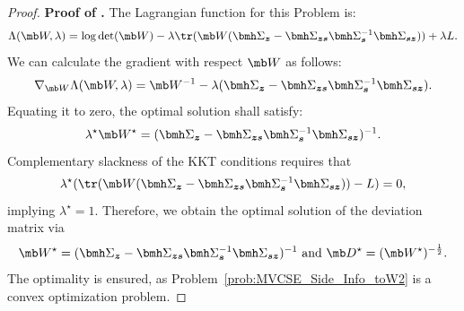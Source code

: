 \documentclass[mnsc, nonblindrev]{informswp}
\newcommand{\1}[1]{\mathds{1}{\left(#1\right)}}
\begin{document}
\begin{appendices}
\begin{proof}{\bf Proof of .}
The Lagrangian function for this Problem is:
$$
\Lambda(\mb W, \lambda) = \log\det(\mb W) - \lambda \tr(\mb W (\bmh \Sigma_{\bm z} - \bmh \Sigma_{\bm z \bm s} \bmh \Sigma_{\bm s}^{-1} \bmh \Sigma_{\bm s \bm z})) + \lambda L.
$$
We can calculate the gradient with respect $\mb W$ as follows:
$$
\nabla_{\mb W} \Lambda(\mb W, \lambda) = \mb W^{-1} - \lambda (\bmh \Sigma_{\bm z} - \bmh \Sigma_{\bm z \bm s} \bmh \Sigma_{\bm s}^{-1} \bmh \Sigma_{\bm s \bm z}).
$$
Equating it to zero, the optimal solution shall satisfy:
$$
\lambda^\star \mb W^\star = (\bmh \Sigma_{\bm z} - \bmh \Sigma_{\bm z \bm s} \bmh \Sigma_{\bm s}^{-1} \bmh \Sigma_{\bm s \bm z} )^{-1}.
$$
Complementary slackness of the KKT conditions requires that
$$
\lambda^\star (\tr(\mb W ( \bmh \Sigma_{\bm z} - \bmh \Sigma_{\bm z \bm s} \bmh \Sigma_{\bm s}^{-1} \bmh \Sigma_{\bm s \bm z})) - L) = 0,
$$
implying $\lambda^\star = 1$. Therefore, we obtain the optimal solution of the deviation matrix via
$$
\mb W^\star = (\bmh \Sigma_{\bm z} - \bmh \Sigma_{\bm z \bm s} \bmh \Sigma_{\bm s}^{-1} \bmh \Sigma_{\bm s \bm z})^{-1} ~\text{and}~ \mb D^\star = (\mb W^\star)^{-\frac{1}{2}}.
$$
The optimality is ensured, as Problem~\eqref{prob:MVCSE_Side_Info_toW2} is a convex optimization problem.
\hfill \Halmos
\end{proof}
\vspace{3mm}


\end{appendices}
\end{document}
